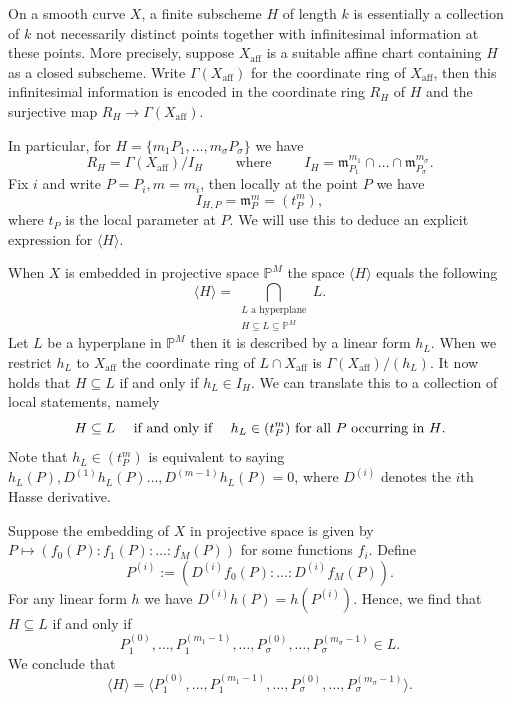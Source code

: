 \documentclass[12pt]{amsart}
\theoremstyle{definition}
\begin{document}
	On a smooth curve $X$, a finite subscheme $H$ of length $k$ is essentially a collection of $k$ not necessarily distinct points together with infinitesimal information at these points. More precisely, suppose $X_{\text{aff}}$ is a suitable affine chart containing $H$ as a closed subscheme. Write $\Gamma(X_{\text{aff}})$ for the coordinate ring of $X_{\text{aff}}$, then this infinitesimal information is encoded in the coordinate ring $R_H$ of $H$ and the surjective map $R_H \rightarrow \Gamma(X_{\text{aff}})$.
	
	In particular, for $H = \{m_1 P_1, \ldots, m_\sigma P_\sigma\}$ we have $$R_H = \Gamma(X_{\text{aff}}) / I_H \qquad \text{ where } \qquad I_H = \mathfrak m_{P_1}^{m_1} \cap \ldots \cap \mathfrak m_{P_\sigma}^{m_\sigma}.$$ 
	Fix $i$ and write $P = P_i, m = m_i$, then locally at the point $P$ we have
	$$ I_{H, P} = \mathfrak m_P^{m} = (t_P^m),$$
	where $t_P$ is the local parameter at $P$. We will use this to deduce an explicit expression for $\langle H \rangle.$
	
	When $X$ is embedded in projective space $\mathbb P^M$ the space $\langle H \rangle$ equals the following
	$$\langle H \rangle = \bigcap_{\substack{L \text{ a hyperplane} \\ H \subseteq L \subseteq \mathbb P^M}} L.$$ 
	Let $L$ be a hyperplane in $\mathbb P^M$ then it is described by a linear form $h_L$. When we restrict $h_L$ to $X_{\text{aff}}$ the coordinate ring of $L\cap X_{\text{aff}}$ is $\Gamma(X_{\text{aff}})/(h_L)$. It now holds that $H \subseteq L$ if and only if $h_L \in I_H$. We can translate this to a collection of local statements, namely 
	$$H \subseteq L \quad \textup{ if and only if } \quad h_{L} \in (t_P^m) \text{ for all $P$ occurring in $H$.}$$
	Note that $h_{L} \in (t_P^m)$ is equivalent to saying $h_L(P), D^{(1)}h_L(P) \ldots, D^{(m-1)}h_L(P) = 0$, where $D^{(i)}$ denotes the $i$th Hasse derivative. 
	
	Suppose the embedding of $X$ in projective space is given by $P \mapsto (f_0(P): f_1(P) : \ldots : f_M(P))$ for some functions $f_i$. Define $$P^{(i)} := (D^{(i)} f_0(P) : \ldots : D^{(i)}f_M(P)).$$ 
	For any linear form $h$ we have $D^{(i)} h (P) = h(P^{(i)})$. Hence, we find that $H \subseteq L$ if and only if $$P_1^{(0)}, \ldots, P_1^{(m_1-1)}, \ldots, P_\sigma^{(0)}, \ldots, P_\sigma^{(m_\sigma-1)} \in L.$$ We conclude that 
	$$\langle H \rangle = \langle P_1^{(0)}, \ldots, P_1^{(m_1-1)}, \ldots, P_\sigma^{(0)}, \ldots, P_\sigma^{(m_\sigma-1)} \rangle.$$
	
\end{document}

